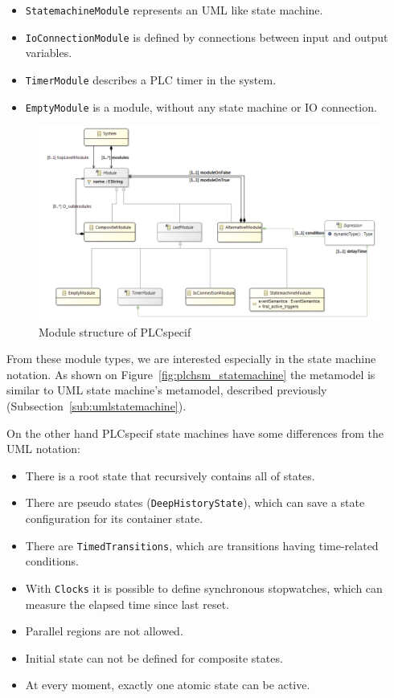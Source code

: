 \begin{itemize}
	\item \texttt{StatemachineModule} represents an UML like state machine.
	\item \texttt{IoConnectionModule} is defined by connections between input and output variables.
	\item \texttt{TimerModule} describes a PLC timer in the system.
	\item \texttt{EmptyModule} is a module, without any state machine or IO connection.
\end{itemize}

\begin{figure}[htp]
\centering
\includegraphics[scale=0.45]{figures/plchsm_modules}
\caption{Module structure of PLCspecif \cite{plcspecif}}
\label{fig:plchsm_modules}
\end{figure}

From these module types, we are interested especially in the state machine notation. As shown on Figure~\ref{fig:plchsm_statemachine} the metamodel is similar to UML state machine's metamodel, described previously (Subsection~\ref{sub:umlstatemachine}).

On the other hand PLCspecif state machines have some differences from the UML notation:

\begin{itemize}
	\item There is a root state that recursively contains all of states.
	\item There are pseudo states (\texttt{DeepHistoryState}), which can save a state configuration for its container state.
	\item There are \texttt{TimedTransitions}, which are transitions having time-related conditions.
	\item With \texttt{Clocks} it is possible to define synchronous stopwatches, which can measure the elapsed time since last reset.
	\item Parallel regions are not allowed.
	\item Initial state can not be defined for composite states.
	\item At every moment, exactly one atomic state can be active. 
\end{itemize}

